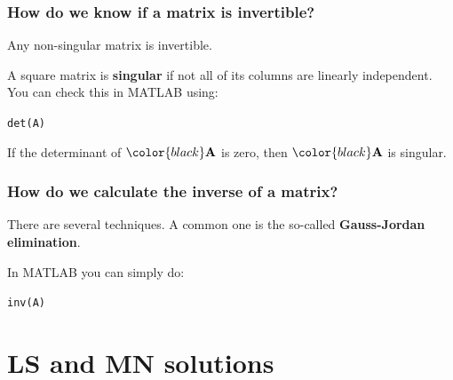 \documentclass[compress]{beamer}
\newcommand{\black}[1]{{\color{black}#1}}
\renewcommand{\emph}[1]{\textbf{\black{#1}}}
\begin{document}
\begin{frame}[fragile]
\frametitle{How do we know if a matrix is invertible?}

Any non-singular matrix is invertible. 

\vspace{.5cm}
A square matrix is \emph{singular} if not all of its columns are linearly independent. You can check this in MATLAB using:

\vspace{.5cm}
\color{black}\verb|det(A)|\color{gray}

\vspace{.5cm}
If the determinant of $\black{\A}$ is zero, then $\black{\A}$ is singular.


\end{frame}



\begin{frame}[fragile]
\frametitle{How do we calculate the inverse of a matrix?}

There are several techniques. A common one is the so-called \emph{Gauss-Jordan elimination}.

\vspace{.5cm}

In MATLAB you can simply do:

\vspace{.5cm}

\color{black}
\verb|inv(A)|
\color{gray}

\end{frame}


\section{LS and MN solutions}
\subsection*{}
\end{document}
